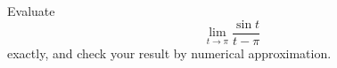 Evaluate
\begin{equation*}
  \lim_{t\rightarrow \pi} \frac{\sin t}{t-\pi}
\end{equation*}
exactly, and check your result by numerical approximation.
